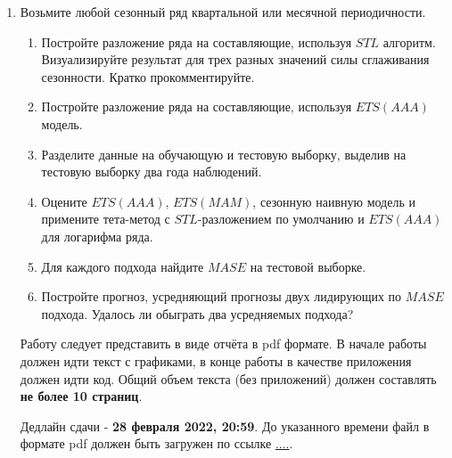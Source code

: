\documentclass[12pt]{article}
\begin{document}
\begin{enumerate}
\newpage

\item Возьмите любой сезонный ряд квартальной или месячной периодичности. 

\begin{enumerate}
    \item Постройте разложение ряда на составляющие, используя $STL$ алгоритм. 
    Визуализируйте результат для трех разных значений силы сглаживания сезонности. Кратко прокомментируйте.
    
    \item Постройте разложение ряда на составляющие, используя $ETS(AAA)$ модель. 
    
    \item Разделите данные на обучающую и тестовую выборку, выделив на тестовую выборку два года наблюдений. 
    
    \item Оцените $ETS(AAA)$, $ETS(MAM)$, сезонную наивную модель и примените тета-метод с $STL$-разложением по умолчанию и $ETS(AAA)$ для логарифма ряда. 
    
    \item Для каждого подхода найдите $MASE$ на тестовой выборке.
    
    \item Постройте прогноз, усредняющий прогнозы двух лидирующих по $MASE$ подхода. Удалось ли обыграть два усредняемых подхода?
    
\end{enumerate}



Работу следует представить в виде отчёта в pdf формате. 
В начале работы должен идти текст с графиками, в конце работы в качестве приложения должен идти код. 
Общий объем текста (без приложений) должен составлять \textbf{не более 10 страниц}.

Дедлайн сдачи - \textbf{28 февраля 2022, 20:59}. До указанного времени файл в формате pdf должен быть загружен по ссылке
\url{....}.

\end{enumerate}
\end{document}
